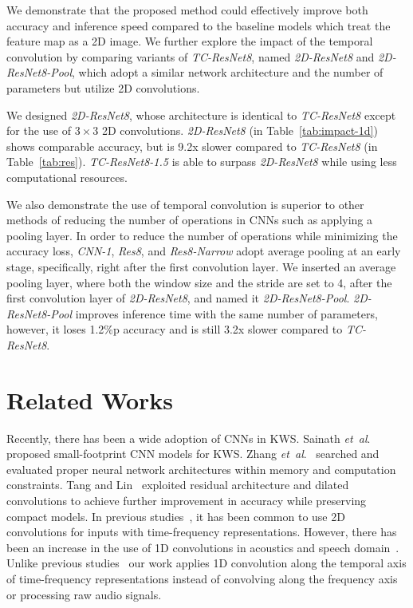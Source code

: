 \documentclass[a4paper]{article}
\begin{document}
We demonstrate that the proposed method could effectively improve both accuracy and inference speed compared to the baseline models which treat the feature map as a 2D image.
We further explore the impact of the temporal convolution by comparing variants of \emph{TC-ResNet8}, named \emph{2D-ResNet8} and \emph{2D-ResNet8-Pool}, which adopt a similar network architecture and the number of parameters but utilize 2D convolutions.

We designed \emph{2D-ResNet8}, whose architecture is identical to \emph{TC-ResNet8} except for the use of $3 \times 3$ 2D convolutions.
\emph{2D-ResNet8} (in Table~\ref{tab:impact-1d}) shows comparable accuracy, but is 9.2x slower compared to \emph{TC-ResNet8} (in Table~\ref{tab:res}).
\emph{TC-ResNet8-1.5} is able to surpass \emph{2D-ResNet8} while using less computational resources.


We also demonstrate the use of temporal convolution is superior to other methods of reducing the number of operations in CNNs such as applying a pooling layer.
In order to reduce the number of operations while minimizing the accuracy loss, \emph{CNN-1}, \emph{Res8}, and \emph{Res8-Narrow} adopt average pooling at an early stage, specifically, right after the first convolution layer.
We inserted an average pooling layer, where both the window size and the stride are set to 4, after the first convolution layer of \emph{2D-ResNet8}, and named it \emph{2D-ResNet8-Pool}.
\emph{2D-ResNet8-Pool} improves inference time with the same number of parameters, however, it loses 1.2\%p accuracy and is still 3.2x slower compared to \emph{TC-ResNet8}.





\section{Related Works} \label{section:relatedwork}

Recently, there has been a wide adoption of CNNs in KWS.
Sainath \emph{et~al}.~\cite{sainath-interspeech-2015-cnn} proposed small-footprint CNN models for KWS.
Zhang \emph{et~al}.~\cite{zhang-arxiv-2017-helloedge} searched and evaluated proper neural network architectures within memory and computation constraints.
Tang and Lin~\cite{tang-icassp-2018-residual} exploited residual architecture and dilated convolutions to achieve further improvement in accuracy while preserving compact models.
In previous studies~\cite{sainath-interspeech-2015-cnn, zhang-arxiv-2017-helloedge, tang-icassp-2018-residual}, it has been common to use 2D convolutions for inputs with time-frequency representations.
However, there has been an increase in the use of 1D convolutions in acoustics and speech domain~\cite{lim-dcase-2017-rare, choi-icassp-2017-music}.
Unlike previous studies~\cite{lim-dcase-2017-rare, choi-icassp-2017-music} our work applies 1D convolution along the temporal axis of time-frequency representations instead of convolving along the frequency axis or processing raw audio signals.
\end{document}
